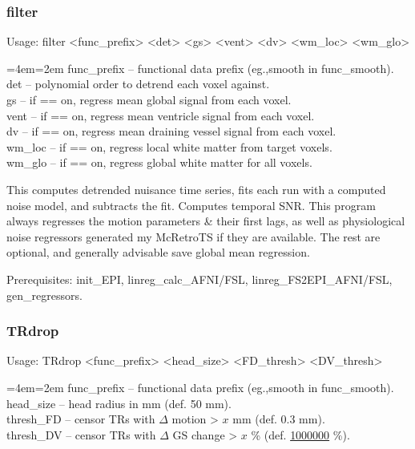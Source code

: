 \documentclass[final,titlepage,letterpaper,oneside,12pt]{article}
\renewcommand{\texttt}[2][BrickRed]{\textcolor{#1}{\ttfamily #2}}%
\newenvironment{blockquote}{%
  \par%
  \medskip
  \leftskip=4em\rightskip=2em%
  \noindent\ignorespaces}{%
  \par\medskip}
\begin{document}
\subsubsection{filter}
Usage: \texttt{filter <func\_prefix> <det> <gs> <vent> <dv> <wm\_loc> <wm\_glo>}

\begin{blockquote}
func\_prefix -- functional data prefix (eg.,smooth in func\_smooth). \\
det -- polynomial order to detrend each voxel against. \\
gs -- if == on, regress mean global signal from each voxel. \\
vent -- if == on, regress mean ventricle signal from each voxel. \\
dv -- if == on, regress mean draining vessel signal from each voxel. \\
wm\_loc -- if == on, regress local white matter from target voxels. \\
wm\_glo -- if == on, regress global white matter for all voxels. \

\end{blockquote}

\noindent This computes detrended nuisance time series, fits each run with a computed noise model, and subtracts the fit. Computes temporal SNR. This program always regresses the motion parameters \& their first lags, as well as physiological noise regressors generated my McRetroTS if they are available. The rest are optional, and generally advisable save global mean regression.

Prerequisites: \texttt{init\_EPI}, \texttt{linreg\_calc\_AFNI/FSL}, \texttt{linreg\_FS2EPI\_AFNI/FSL}, \texttt{gen\_regressors}.

\subsubsection{TRdrop}
Usage: \texttt{TRdrop <func\_prefix> <head\_size> <FD\_thresh> <DV\_thresh>}

\begin{blockquote}
func\_prefix -- functional data prefix (eg.,smooth in func\_smooth). \\
head\_size -- head radius in mm (def. 50 mm). \\
thresh\_FD -- censor TRs with $\Delta$ motion > $x$ mm (def. 0.3 mm). \\
thresh\_DV -- censor TRs with $\Delta$ GS change > $x$ \% (def. \href{http://upload.wikimedia.org/wikipedia/en/1/16/Drevil_million_dollars.jpg}{1000000} \%). \
\end{blockquote}
\end{document}
